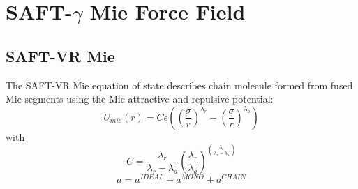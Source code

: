 
\chapter{SAFT-$\gamma$ Mie Force Field} %

\label{ChapterX} %


\section{SAFT-VR Mie}

The SAFT-VR Mie equation of state \cite{abntex2classe} describes chain molecule formed from fused Mie segments using the Mie attractive and repulsive potential: 
\begin{equation}
U_{mie}(r) = C\epsilon \left( \left(\frac{\sigma}{r} \right)^{\lambda_r} - \left(\frac{\sigma}{r} \right)^{\lambda_a} \right)
\label{eqn:miepotential}
\end{equation}
with
\begin{equation}
C = \frac{\lambda_r}{\lambda_r - \lambda_a} \left(\frac{\lambda_r}{\lambda_a} \right)^{\left( \frac{\lambda_a}{\lambda_r - \lambda_a} \right)}
\label{eqn:coefmie}
\end{equation}
\begin{equation}
a = a^{IDEAL} + a^{MONO} + a^{CHAIN}
\label{eqn:miehelm}
\end{equation}

